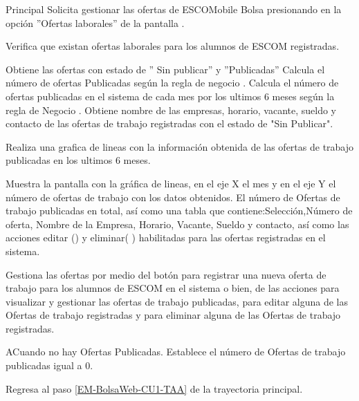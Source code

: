 \begin{UCtrayectoria}{Principal}
	\UCpaso [\UCactor] Solicita gestionar las ofertas de ESCOMobile Bolsa presionando en la opción ''Ofertas laborales'' de la pantalla .

	\UCpaso  Verifica que existan ofertas laborales para los alumnos de ESCOM registradas.  

	\UCpaso Obtiene las ofertas con estado de '' Sin publicar'' y ''Publicadas'' 
	\UCpaso Calcula el número de ofertas Publicadas según la regla de negocio  .
	\UCpaso Calcula el número de ofertas publicadas en el sistema de cada mes por los ultimos 6 meses según la regla de Negocio .
	\UCpaso Obtiene nombre de las empresas, horario, vacante, sueldo y contacto de las ofertas de trabajo registradas con el estado de "Sin Publicar".
	
		
		
		\UCpaso Realiza una grafica de lineas con la información obtenida de las ofertas de trabajo publicadas en los ultimos 6 meses.
		
	\UCpaso Muestra la pantalla  con la gráfica de lineas, en el eje X el mes y en el eje Y el número de ofertas de trabajo con los datos obtenidos. El número de Ofertas de trabajo publicadas en total, así como una tabla que contiene:Selección,Número de oferta, Nombre de la Empresa, Horario, Vacante, Sueldo y contacto, así como las acciones editar () y eliminar( ) habilitadas para las ofertas registradas en el sistema. \label{EM-BolsaWeb-CU1-TAA}  


	\UCpaso Gestiona las ofertas por medio del botón  para registrar una nueva oferta de trabajo para los alumnos de ESCOM en el sistema o bien, de las acciones  para visualizar y gestionar las ofertas de trabajo publicadas,  para editar alguna de las Ofertas de trabajo registradas y  para eliminar alguna de las Ofertas de trabajo registradas.

\end{UCtrayectoria}

\begin{UCtrayectoriaA}{A}{Cuando no hay Ofertas Publicadas.}
	\UCpaso Establece el número de Ofertas de trabajo publicadas igual a 0. 

	\UCpaso Regresa al paso \ref{EM-BolsaWeb-CU1-TAA} de la trayectoria principal.
\end{UCtrayectoriaA}

